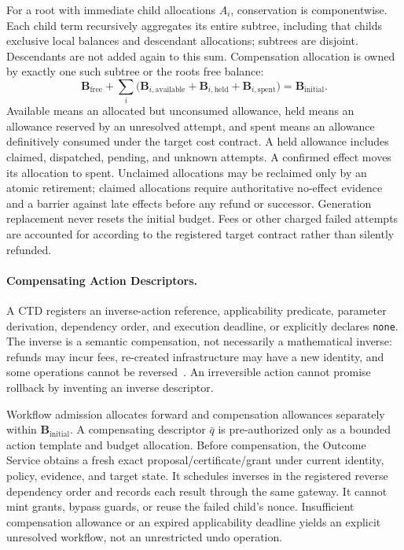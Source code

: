 For a root with immediate child allocations $A_i$, conservation is componentwise. Each child term recursively aggregates its entire subtree, including that child\textquotesingle s exclusive local balances and descendant allocations; subtrees are disjoint. Descendants are not added again to this sum. Compensation allocation is owned by exactly one such subtree or the root\textquotesingle s free balance:
\begin{equation}
\mathbf{B}_{\mathrm{free}}+
\sum_i\big(\mathbf{B}_{i,\mathrm{available}}+
\mathbf{B}_{i,\mathrm{held}}+\mathbf{B}_{i,\mathrm{spent}}\big)
=\mathbf{B}_{\mathrm{initial}}.
\label{eq:saga-conservation}
\end{equation}
Available means an allocated but unconsumed allowance, held means an allowance reserved by an unresolved attempt, and spent means an allowance definitively consumed under the target cost contract. A held allowance includes claimed, dispatched, pending, and unknown attempts. A confirmed effect moves its allocation to spent. Unclaimed allocations may be reclaimed only by an atomic retirement; claimed allocations require authoritative no-effect evidence and a barrier against late effects before any refund or successor. Generation replacement never resets the initial budget. Fees or other charged failed attempts are accounted for according to the registered target contract rather than silently refunded.

\paragraph{Compensating Action Descriptors.}
A CTD registers an inverse-action reference, applicability predicate, parameter derivation, dependency order, and execution deadline, or explicitly declares \texttt{none}. The inverse is a semantic compensation, not necessarily a mathematical inverse: refunds may incur fees, re-created infrastructure may have a new identity, and some operations cannot be reversed~\cite{sagas1987}. An irreversible action cannot promise rollback by inventing an inverse descriptor.

Workflow admission allocates forward and compensation allowances separately within $\mathbf{B}_{\mathrm{initial}}$. A compensating descriptor $\bar q$ is pre-authorized only as a bounded action template and budget allocation. Before compensation, the Outcome Service obtains a fresh exact proposal/certificate/grant under current identity, policy, evidence, and target state. It schedules inverses in the registered reverse dependency order and records each result through the same gateway. It cannot mint grants, bypass guards, or reuse the failed child's nonce. Insufficient compensation allowance or an expired applicability deadline yields an explicit unresolved workflow, not an unrestricted undo operation.

